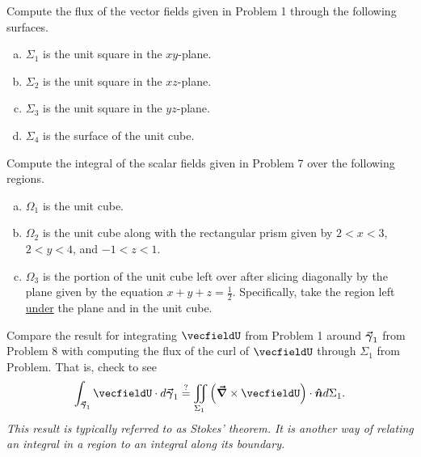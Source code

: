 \documentclass[12pt]{article} %
\begin{document}
\begin{problem}
Compute the flux of the vector fields given in Problem 1 through the following surfaces.
\begin{multicols}{2}
\begin{enumerate}[(a)]
    \item $\Sigma_1$ is the unit square in the $xy$-plane.  
    \item $\Sigma_2$ is the unit square in the $xz$-plane.
    \item $\Sigma_3$ is the unit square in the $yz$-plane.
    \item $\Sigma_4$ is the surface of the unit cube.
\end{enumerate}
\end{multicols}
\end{problem}

\begin{problem}
    Compute the integral of the scalar fields given in Problem 7 over the following regions.
  \begin{multicols}{2}
  \begin{enumerate}[(a)]
      \item $\Omega_1$ is the unit cube.
      \item $\Omega_2$ is the unit cube along with the rectangular prism given by $2<x<3$, $2<y<4$, and $-1<z<1$.
      \item $\Omega_3$ is the portion of the unit cube left over after slicing diagonally by the plane given by the equation $x+y+z=\frac{1}{2}$. Specifically, take the region left \underline{under} the plane and in the unit cube.
  \end{enumerate}
  \end{multicols}  
\end{problem}

\begin{problem}
Compare the result for integrating $\vecfieldU$ from Problem 1 around $\boldsymbol{\vec{\gamma}}_1$ from Problem 8 with computing the flux of the curl of $\vecfieldU$ through $\Sigma_1$ from Problem. That is, check to see
\[
\int_{\curvegamma_1} \vecfieldU \cdot d\curvegamma_1 \stackrel{?}{=} \iint_{\Sigma_1} \left(\grad \times \vecfieldU \right)\cdot \unitvec d\Sigma_1.
\]
\emph{This result is typically referred to as Stokes' theorem. It is another way of relating an integral in a region to an integral along its boundary.}
\end{problem}
\end{document}
